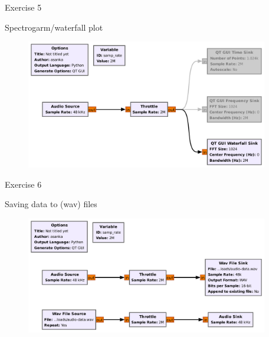 \documentclass[handout]{beamer}
\begin{document}
\begin{frame}{Exercise 5}  

\footnotesize
Spectrogarm/waterfall plot

	\begin{figure}
		\includegraphics[width=300pt]{figures/Example-5.pdf}
	\end{figure}

\end{frame}


\begin{frame}{Exercise 6}  

\footnotesize
Saving data to (wav) files

	\begin{figure}
		\includegraphics[width=300pt]{figures/Example-6.pdf}
	\end{figure}

\end{frame}
\end{document}
